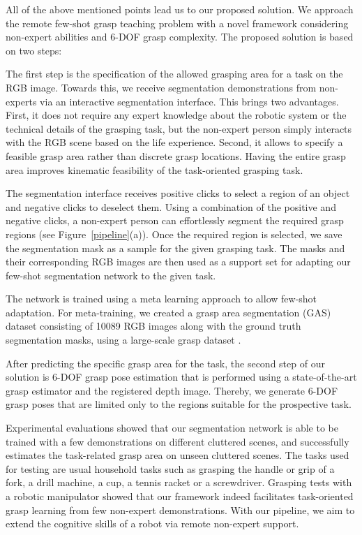 \documentclass[letterpaper]{article} %
\begin{document}
All of the above mentioned points lead us to our proposed solution. We approach the remote few-shot grasp teaching problem with a novel framework considering non-expert abilities and 6-DOF grasp complexity. The proposed solution is based on two steps:

The first step is the specification of the allowed grasping area for a task on the RGB image. Towards this, we receive segmentation demonstrations from non-experts via an interactive segmentation interface. This brings two advantages. First, it does not require any expert knowledge about the robotic system or the technical details of the grasping task, but the non-expert person simply interacts with the RGB scene based on the life experience. Second, it allows to specify a feasible grasp area rather than discrete grasp locations. Having the entire grasp area improves kinematic feasibility of the task-oriented grasping task.

The segmentation interface receives positive clicks to select a region of an object and negative clicks to deselect them. Using a combination of the positive and negative clicks, a non-expert person can effortlessly segment the required grasp regions (see Figure~\ref{pipeline}(a)). Once the required region is selected, we save the segmentation mask as a sample for the given grasping task. The masks and their corresponding RGB images are then used as a support set for adapting our few-shot segmentation network to the given task.


The network is trained using a meta learning approach \cite{nichol2018reptile} to allow few-shot adaptation. For meta-training, we created a grasp area segmentation (GAS) dataset consisting of 10089 RGB images along with the ground truth segmentation masks, using a large-scale grasp dataset \cite{fang2020graspnet}.

After predicting the specific grasp area for the task, the second step of our solution is 6-DOF grasp pose estimation that is performed using a state-of-the-art grasp estimator \cite{sundermeyer2021contact} and the registered depth image. Thereby, we generate 6-DOF grasp poses that are limited only to the regions suitable for the prospective task.

Experimental evaluations showed that our segmentation network is able to be trained with a few demonstrations on different cluttered scenes, and successfully estimates the task-related grasp area on unseen cluttered scenes. The tasks used for testing are usual household tasks such as grasping the handle or grip of a fork, a drill machine, a cup, a tennis racket or a screwdriver. Grasping tests with a robotic manipulator showed that our framework indeed facilitates task-oriented grasp learning from few non-expert demonstrations. With our pipeline, we aim to extend the cognitive skills of a robot via remote non-expert support.
\end{document}
